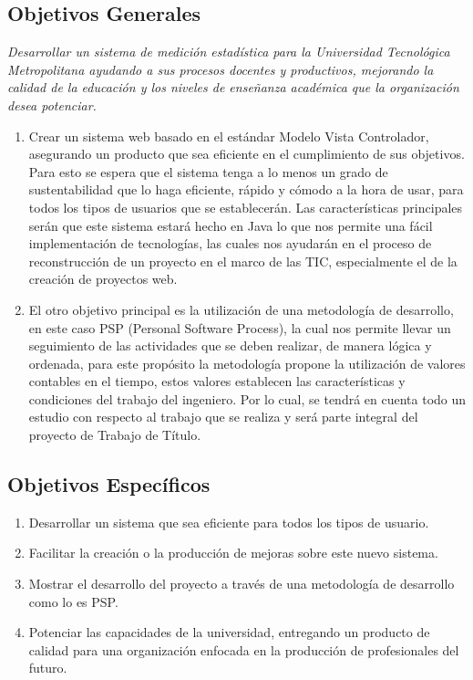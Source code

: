 \documentclass[a4paper,12pt,openany,oneside]{book}
\begin{document}
\subsection{Objetivos Generales}
\textit{Desarrollar un sistema de medición estadística para la Universidad Tecnológica Metropolitana ayudando a sus procesos docentes y productivos, mejorando la calidad de la educación y los niveles de enseñanza académica que la organización desea potenciar.}
\begin{enumerate}
\item Crear un sistema web basado en el estándar Modelo Vista Controlador, asegurando un producto que sea eficiente en el cumplimiento de sus objetivos. Para esto se espera que el sistema tenga a lo menos un grado de sustentabilidad que lo haga eficiente, rápido y cómodo a la hora de usar, para todos los tipos de usuarios que se establecerán. Las características principales serán que este sistema estará hecho en Java lo que nos permite una fácil implementación de tecnologías, las cuales nos ayudarán en el proceso de reconstrucción de un proyecto en el marco de las TIC, especialmente el de la creación de proyectos web.
\item El otro objetivo principal es la utilización de una metodología de desarrollo, en este caso PSP (Personal Software Process), la cual nos permite llevar un seguimiento de las actividades que se deben realizar, de manera lógica y ordenada, para este propósito la metodología propone la utilización de valores contables en el tiempo, estos valores establecen las características y condiciones del trabajo del ingeniero. Por lo cual, se tendrá en cuenta todo un estudio con respecto al trabajo que se realiza y será parte integral del proyecto de Trabajo de Título.
\end{enumerate}
\subsection{Objetivos Específicos}
\begin{enumerate}
	\item Desarrollar un sistema que sea eficiente para todos los tipos de usuario.
	\item Facilitar la creación o la producción de mejoras sobre este nuevo sistema.
	\item Mostrar el desarrollo del proyecto a través de una metodología de desarrollo como lo es PSP.
	\item Potenciar las capacidades de la universidad, entregando un producto de calidad para una organización enfocada en la producción de profesionales del futuro.
\end{enumerate}
\end{document}

